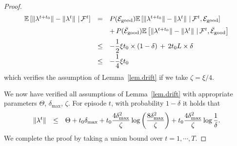\documentclass[12pt, final]{l4dc2023}
\begin{document}
\begin{proof}
\[\begin{array}{rcl}
	\mathbb{E} \left[ \left\|{\lambda^{t+t_0}}\right\| - \left\|{\lambda^{t}}\right\|\,\vert\, {\mathcal{F}}^{t}\right] 
	& = & P(\mathcal{E}_{\text{good}})\mathbb{E} \left[ \left\|{\lambda^{t+t_0}}\right\| - \left\|{\lambda^{t}}\right\|\,\vert\, {\mathcal{F}}^{t}, \mathcal{E}_{\text{good}} \right] 
	\\[0.2cm]
	&  & + \,
	P(\bar{\mathcal{E}}_{\text{good}})\mathbb{E} \left[ \left\|{\lambda^{t+t_0}}\right\| - \left\|{\lambda^{t}}\right\|\,\vert\, {\mathcal{F}}^{t}, \bar{\mathcal{E}}_{\text{good}} \right] 
	\\[0.2cm]
	& \leq &  - \dfrac{1}{2}\xi t_0 \times (1-\delta) \,+\, 2t_0L\times\delta
	\\[0.2cm]
	& \leq & - \dfrac{1}{4}\xi t_0 
	\end{array}
	\]
	which verifies the assumption of Lemma~\ref{lem.drift} if we take $\zeta=\xi/4$.
	
	We now have verified all assumptions of Lemma~\ref{lem.drift} with appropriate parameters $\Theta$, $\delta_{\max}$, $\zeta$. For episode $t$, with probability $1-\delta$ it holds that 
	\[
	\begin{array}{rcl}
	\left\|{\lambda^t}\right\| & \leq & \displaystyle \Theta + t_0 \delta_{\max} + t_0 \frac{4\delta_{\max}^2}{\zeta} \log \left(\frac{8\delta_{\max}^2}{\zeta}\right) + t_0 \frac{4\delta_{\max}^2}{\zeta} \log\frac{1}{\delta}.
	\end{array}
	\]
	We complete the proof by taking a union bound over $t = 1,\cdots,T$.
\end{proof}
\end{document}
